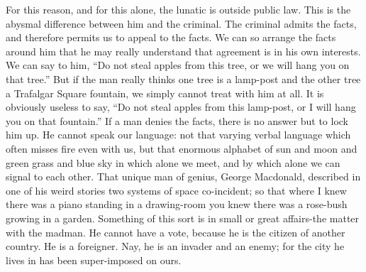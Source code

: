\documentclass{book}
\begin{document}
For this reason, and for this alone, the lunatic is outside public law. This is the abysmal difference between him and the criminal. The criminal admits the facts, and therefore permits us to appeal to the facts. We can so arrange the facts around him that he may really understand that agreement is in his own interests. We can say to him, “Do not steal apples from this tree, or we will hang you on that tree.” But if the man really thinks one tree is a lamp-post and the other tree a Trafalgar Square fountain, we simply cannot treat with him at all. It is obviously useless to say, “Do not steal apples from this lamp-post, or I will hang you on that fountain.” If a man denies the facts, there is no answer but to lock him up. He cannot speak our language: not that varying verbal language which often misses fire even with us, but that enormous alphabet of sun and moon and green grass and blue sky in which alone we meet, and by which alone we can signal to each other. That unique man of genius, George Macdonald, described in one of his weird stories two systems of space co-incident; so that where I knew there was a piano standing in a drawing-room you knew there was a rose-bush growing in a garden. Something of this sort is in small or great affairs-the matter with the madman. He cannot have a vote, because he is the citizen of another country. He is a foreigner. Nay, he is an invader and an enemy; for the city he lives in has been super-imposed on ours.
\end{document}
